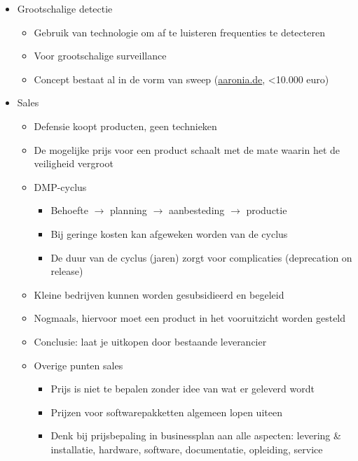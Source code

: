 \documentclass[12pt, a4paper]{article}
\begin{document}
\begin{itemize}
\begin{itemize}
        \item Grootschalige detectie
        \begin{itemize}
            \item Gebruik van technologie om af te luisteren frequenties te detecteren
            \item Voor grootschalige surveillance
            \item Concept bestaat al in de vorm van sweep (\url{aaronia.de}, <10.000 euro)
        \end{itemize}

        \item Sales
        \begin{itemize}
            \item Defensie koopt producten, geen technieken
            \item De mogelijke prijs voor een product schaalt met de mate waarin het de veiligheid vergroot
            \item DMP-cyclus

            \begin{itemize}
                \item Behoefte $\rightarrow$ planning $\rightarrow$ aanbesteding $\rightarrow$ productie
                \item Bij geringe kosten kan afgeweken worden van de cyclus
                \item De duur van de cyclus (jaren) zorgt voor complicaties (deprecation on release)
            \end{itemize}

            \item Kleine bedrijven kunnen worden gesubsidieerd en begeleid
            \item Nogmaals, hiervoor moet een product in het vooruitzicht worden gesteld
            \item Conclusie: laat je uitkopen door bestaande leverancier

            \item Overige punten sales
            \begin{itemize}
                \item Prijs is niet te bepalen zonder idee van wat er geleverd wordt
                \item Prijzen voor softwarepakketten algemeen lopen uiteen
                \item Denk bij prijsbepaling in businessplan aan alle aspecten: levering \& installatie, hardware, software, documentatie, opleiding, service
            \end{itemize}
        \end{itemize}


\end{itemize}
\end{itemize}
\end{document}
